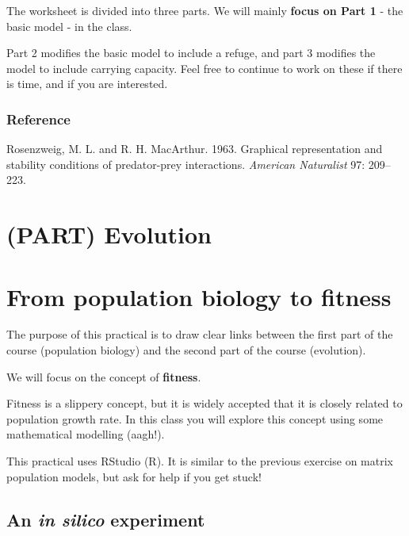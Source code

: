 \documentclass[
  a4paper]{book}
\begin{document}
The worksheet is divided into three parts. We will mainly \textbf{focus
on Part 1} - the basic model - in the class.

Part 2 modifies the basic model to include a refuge, and part 3 modifies
the model to include carrying capacity. Feel free to continue to work on
these if there is time, and if you are interested.

\hypertarget{reference}{%
\subsection{Reference}\label{reference}}

Rosenzweig, M. L. and R. H. MacArthur. 1963. Graphical representation
and stability conditions of predator-prey interactions. \emph{American
Naturalist} 97: 209--223.

\hypertarget{part-evolution}{%
\chapter*{(PART) Evolution}\label{part-evolution}}

\hypertarget{from-population-biology-to-fitness}{%
\chapter{From population biology to
fitness}\label{from-population-biology-to-fitness}}

The purpose of this practical is to draw clear links between the first
part of the course (population biology) and the second part of the
course (evolution).

We will focus on the concept of \textbf{fitness}.

Fitness is a slippery concept, but it is widely accepted that it is
closely related to population growth rate. In this class you will
explore this concept using some mathematical modelling (aagh!).

\begin{do-something}
This practical uses RStudio (R). It is similar to the previous exercise
on matrix population models, but ask for help if you get stuck!
\end{do-something}

\hypertarget{an-in-silico-experiment}{%
\section{\texorpdfstring{An \emph{in silico}
experiment}{An in silico experiment}}\label{an-in-silico-experiment}}
\end{document}
